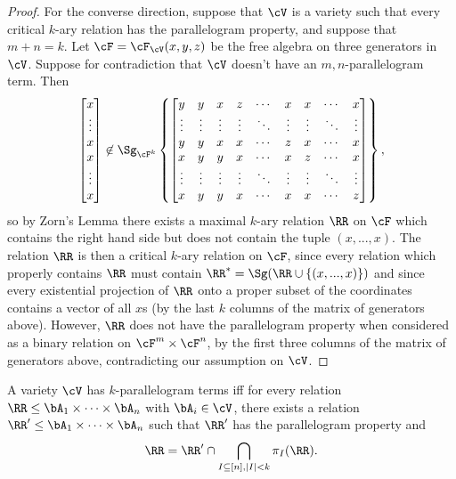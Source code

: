 \begin{proof}
For the converse direction, suppose that $\cV$ is a variety such that every critical $k$-ary relation has the parallelogram property, and suppose that $m+n = k$. Let $\cF = \cF_\cV(x,y,z)$ be the free algebra on three generators in $\cV$. Suppose for contradiction that $\cV$ doesn't have an $m,n$-parallelogram term. Then
\[
\begin{bmatrix} x\\ \vdots\\ x\\ x\\ \vdots\\ x \end{bmatrix} \not\in \Sg_{\cF^k}\left\{\begin{bmatrix} y & y & x & z & \cdots & x & x & \cdots & x\\ \vdots & \vdots & \vdots & \vdots & \ddots & \vdots & \vdots & \ddots & \vdots\\ y & y & x & x & \cdots & z & x & \cdots & x\\ x & y & y & x & \cdots & x & z & \cdots & x\\ \vdots & \vdots & \vdots & \vdots & \ddots & \vdots & \vdots & \ddots & \vdots\\ x & y & y & x & \cdots & x & x & \cdots & z \end{bmatrix}\right\},
\]
so by Zorn's Lemma there exists a maximal $k$-ary relation $\RR$ on $\cF$ which contains the right hand side but does not contain the tuple $(x,...,x)$. The relation $\RR$ is then a critical $k$-ary relation on $\cF$, since every relation which properly contains $\RR$ must contain $\RR^* = \Sg(\RR \cup \{(x,...,x)\})$ and since every existential projection of $\RR$ onto a proper subset of the coordinates contains a vector of all $x$s (by the last $k$ columns of the matrix of generators above). However, $\RR$ does not have the parallelogram property when considered as a binary relation on $\cF^m\times \cF^n$, by the first three columns of the matrix of generators above, contradicting our assumption on $\cV$.
\end{proof}

\begin{cor} A variety $\cV$ has $k$-parallelogram terms iff for every relation $\RR \le \bA_1 \times \cdots \times \bA_n$ with $\bA_i \in \cV$, there exists a relation $\RR' \le \bA_1 \times \cdots \times \bA_n$ such that $\RR'$ has the parallelogram property and
\[
\RR = \RR' \cap \bigcap_{I \subseteq [n], |I| < k} \pi_{I}(\RR).
\]
\end{cor}

